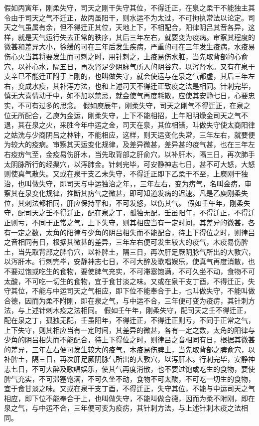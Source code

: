 \documentclass[12pt,UTF8]{ctexbook}
\begin{document}
假如丙寅年，刚柔失守，司天之刚干失守其位，不得迁正，在泉之柔干不能独主其令由于司天之气不迁正，故丙虽阳干，则水运不为太过，不可拘执常法以论定。司天之气虽属有余，但不得迁正其位，天地上下，不相配合，阳律阴吕其音各异，这样，就是天气运行失去正常的秩序，其后三年左右，就要变为疫病。审察其程度的微甚和差异大小，徐缓的可在三年后发生疾病，严重的可在三年发生疫病，水疫易伤心火当其将要发生而可刺之时，用针刺之，土疫易伤水脏，当先取背部的心俞穴，以补心水，隔五日，再次肾足少阴脉气所入的阴谷穴，以泻肾水。又有在泉干支辛巳不能迁正附于上刚的，也叫做失守，就会使运与在泉之气都虚，其后三年左右，变成水疫，其补泻方法，也和上述司天不得迁正致疫之法是相同。针刺完毕，慎无大喜情动于中，如不加以禁忌，就会使气再度耗散，应使其安静七日，心要忠实，不可有过多的思念。
假如庾辰年，刚柔失守，司天之刚气不得迁正，在泉之位无所配合，乙庾为金运，刚柔失守，上下不能相招，上年阳明燥金司天之气不退，其在泉之火，来胜今年中运之金，司天在泉，其位相错，叫做失守使太商阳律之姑洗与少商阴吕之林钟，不能相应，这样，则天运变化失常，三年左右，就要便为较大的疫病。审察其天运变化规律，及差异微甚，差异甚的疫气甚，也在三年左右疫疠气至，金疫易伤肝木，当先取背部之肝俞穴，以补肝木，隔三日，再次肺手太阴脉所行的经渠穴，以泻肺金。针刺完毕，可安静神志七日，甚不可大怒，大怒则使真气散失。又或在泉干支乙未失守，不得迁正即下乙柔干不至，上庾刚干独治，也叫做失守，即司天与中运独治之年，，三年左右，变为疠气，名叫金疠，审察其在泉变化规律，推断其疠气之微甚，即可知道发病的迟速。凡是乙庾刚柔失位，其刺法都相同，肝应保持平和，不可发怒，以伤其气。
假如壬午年，刚柔失守，配司天之壬不得迁正，配在泉之丁，孤独无配，壬虽阳年，不得迁正，不得迁正则亏，不同于正常之气，上下失守，则其相应当有一定时间，其差异的微甚，各有一定之数，太角的阳律与少角的阴吕相失而不能配合，待上下得位之时，则律吕之音相同有日，根据其微甚的差异，三年左右便可发生较大的疫气，木疫易伤脾土，当先取背部之脾俞穴，以补脾土，隔三日，再次肝足厥阴脉气所出的大敦穴，以泻肝木。行刺完毕，安静神志七日，不可大醉及歌唱娱乐，使真气再度消散，也不要过饱或吃生的食物，要使脾气充实，不可滞塞饱满，不可久坐不动，食物不可太酸，不可吃一切生的食物，宜于食甘淡之味。又或在泉干支丁酉，不得迁正，失守其位，不能与中运司天之气相应，即下位不能奉合于上，也叫做失守，不能叫做合德，因而为柔不附刚，即在泉之气，与中运不合，三年便可变为疫疠，其针刺方法，与上述针刺木疫之法相同。
假如壬午年，刚柔失守，配司天之壬不得迁正，配在泉之丁，孤独无配，壬虽阳年，不得迁正，不得迁正则亏，不同于正常之气，上下失守，则其相应当有一定时间，其差异的微甚，各有一定之数，太角的阳律与少角的阴吕相失而不能配合，待上下得位之时，则律吕之音相同有日，根据其微甚的差异，三年左右便可发生较大的疫气，木疫易伤脾土，当先取背部之脾俞穴，以补脾土，隔三日，再次肝足厥阴脉气所出的大敦穴，以泻肝木。行刺完毕，安静神志七日，不可大醉及歌唱娱乐，使其气再度消散，也不要过饱或吃生的食物，要使脾气充实，不可滞塞饱满，不可久坐不动，食物不可太酸，不可吃一切生的食物，宜于食甘淡之味。又或在泉干支丁酉，不得迁正，失守其位，不能与中运司天之气相应，即下位不能奉合于上，也叫做失守，不能叫做合德，因而为柔不附刚，即在泉之气，与中运不合，三年便可变为疫疠，其针刺方法，与上述针刺木疫之法相同。
\end{document}

